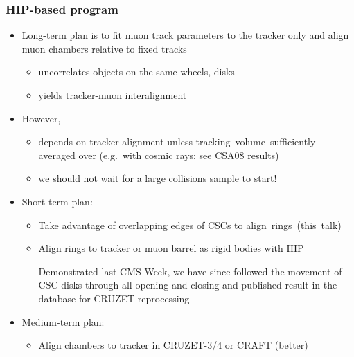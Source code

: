 \documentclass[compress]{beamer}
\begin{document}
\begin{frame}
\frametitle{HIP-based program}
\small

\hspace{-0.5 cm} \begin{minipage}{\linewidth}
\begin{itemize}
\item Long-term plan is to fit muon track parameters to the tracker
  only and align muon chambers relative to fixed tracks
\begin{itemize}
\item uncorrelates objects on the same wheels, disks
\item yields tracker-muon interalignment
\end{itemize}
\item However,
\begin{itemize}
\item depends on tracker alignment unless \mbox{tracking volume sufficiently\hspace{-1 cm}}
  averaged over (e.g.\ with cosmic rays: see CSA08 results)
\item we should not wait for a large collisions sample to start!
\end{itemize}
\item Short-term plan:
\begin{itemize}
\item Take advantage of overlapping edges of CSCs to \mbox{align rings (this talk)\hspace{-1 cm}}
\item Align rings to tracker or muon barrel as rigid bodies with HIP

\vspace{0.1 cm} Demonstrated last CMS Week, we have since followed the
movement of CSC disks through all opening and closing and published result
in the database for CRUZET reprocessing
\end{itemize}

\item Medium-term plan:
\begin{itemize}
\item Align chambers to tracker in CRUZET-3/4 or CRAFT (better)
\end{itemize}
\end{itemize}
\end{minipage}
\end{frame}
\end{document}
